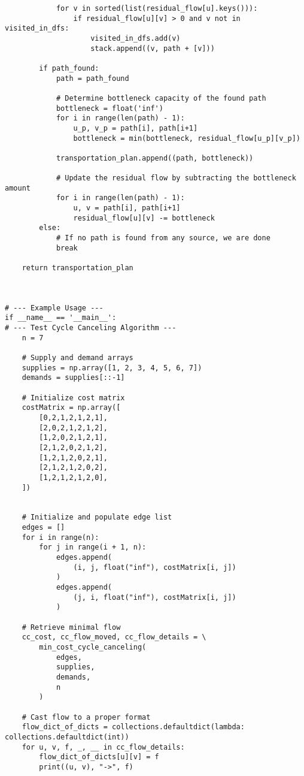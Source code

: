 \begin{verbatim}
            for v in sorted(list(residual_flow[u].keys())):
                if residual_flow[u][v] > 0 and v not in visited_in_dfs:
                    visited_in_dfs.add(v)
                    stack.append((v, path + [v]))
        
        if path_found:
            path = path_found
            
            # Determine bottleneck capacity of the found path
            bottleneck = float('inf')
            for i in range(len(path) - 1):
                u_p, v_p = path[i], path[i+1]
                bottleneck = min(bottleneck, residual_flow[u_p][v_p])

            transportation_plan.append((path, bottleneck))

            # Update the residual flow by subtracting the bottleneck amount
            for i in range(len(path) - 1):
                u, v = path[i], path[i+1]
                residual_flow[u][v] -= bottleneck
        else:
            # If no path is found from any source, we are done
            break
            
    return transportation_plan



# --- Example Usage ---
if __name__ == '__main__':
# --- Test Cycle Canceling Algorithm ---
    n = 7

    # Supply and demand arrays
    supplies = np.array([1, 2, 3, 4, 5, 6, 7])
    demands = supplies[::-1]
    
    # Initialize cost matrix
    costMatrix = np.array([
        [0,2,1,2,1,2,1],
        [2,0,2,1,2,1,2],
        [1,2,0,2,1,2,1],
        [2,1,2,0,2,1,2],
        [1,2,1,2,0,2,1],
        [2,1,2,1,2,0,2],
        [1,2,1,2,1,2,0],
    ])


    # Initialize and populate edge list
    edges = []
    for i in range(n):
        for j in range(i + 1, n):
            edges.append(
                (i, j, float("inf"), costMatrix[i, j])
            )
            edges.append(
                (j, i, float("inf"), costMatrix[i, j])
            )

    # Retrieve minimal flow
    cc_cost, cc_flow_moved, cc_flow_details = \
        min_cost_cycle_canceling(
            edges,
            supplies,
            demands,
            n
        )
    
    # Cast flow to a proper format
    flow_dict_of_dicts = collections.defaultdict(lambda: collections.defaultdict(int))
    for u, v, f, _, __ in cc_flow_details:
        flow_dict_of_dicts[u][v] = f
        print((u, v), "->", f)


\end{verbatim}
